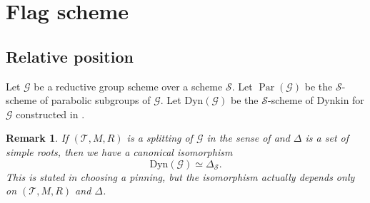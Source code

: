 \documentclass[12pt,a4paper]{article}
\newtheorem{rem}[thm]{Remark}
\DeclareMathOperator{\Par}{Par}
\newcommand{\sG}{\mathscr{G}}
\newcommand{\sS}{\mathscr{S}}
\newcommand{\sT}{\mathscr{T}}
\begin{document}
\section{Flag scheme}\label{sec:fla}
\subsection{Relative position}
Let $\sG$ be a reductive group scheme over a scheme $\sS$. 
Let $\Par (\sG)$ be the $\sS$-scheme of parabolic subgroups of $\sG$. Let 
$\mathrm{Dyn}(\sG)$ be the $\sS$-scheme of Dynkin for $\sG$ 
constructed in \cite[XXIV, 3.3]{SGA3-3}. 
\begin{rem}
If $(\sT,M,R)$ is a splitting of $\sG$ in the sense of 
\cite[XXII, D\'efinition 1.13]{SGA3-3} and 
$\Delta$ is a set of simple roots, 
then we have a canonical isomorphism 
\begin{equation}\label{eq:DynDel}
 \mathrm{Dyn}(\sG) \simeq \Delta_{\sS} . 
\end{equation}
This is stated in \cite[XXIV, 3.4 (iii)]{SGA3-3} 
choosing a pinning, 
but the isomorphism actually depends only on 
$(\sT,M,R)$ and $\Delta$. 
\end{rem}
\end{document}
